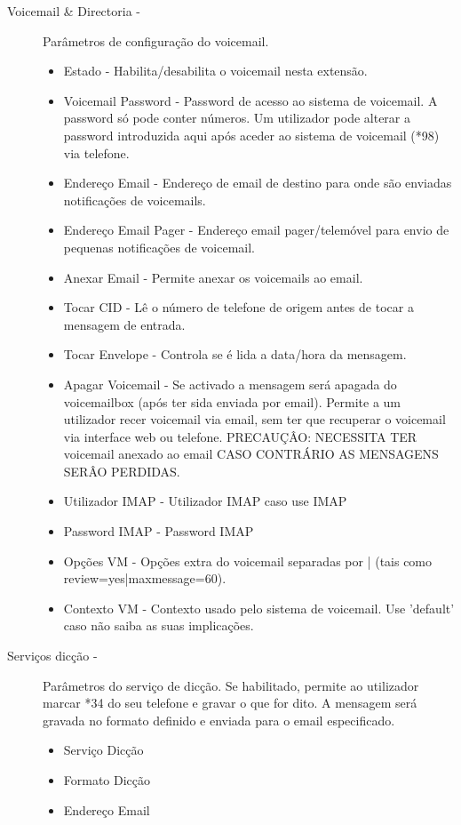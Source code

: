 \begin{description}
\begin{description}
            \item[Voicemail \& Directoria -] Parâmetros de configuração do voicemail.
                \begin{itemize}
                    \item Estado - Habilita/desabilita o voicemail nesta extensão.
                    \item Voicemail Password - Password de acesso ao sistema de voicemail. A password só pode conter números. Um utilizador pode alterar a password introduzida aqui após aceder ao sistema de voicemail (*98) via telefone.
                    \item Endereço Email - Endereço de email de destino para onde são enviadas notificações de voicemails.
                    \item Endereço Email Pager - Endereço email pager/telemóvel para envio de pequenas notificações de voicemail.
                    \item Anexar Email - Permite anexar os voicemails ao email.
                    \item Tocar CID - Lê o número de telefone de origem antes de tocar a mensagem de entrada.
                    \item Tocar Envelope - Controla se é lida a data/hora da mensagem.
                    \item Apagar Voicemail - Se activado a mensagem será apagada do voicemailbox (após ter sida enviada por email). Permite a um utilizador recer voicemail via email, sem ter que recuperar o voicemail via interface web ou telefone.  PRECAUÇÂO: NECESSITA TER voicemail anexado ao email CASO CONTRÁRIO AS MENSAGENS SERÂO PERDIDAS.
                    \item Utilizador IMAP - Utilizador IMAP caso use IMAP
                    \item Password IMAP - Password IMAP
                    \item Opções VM - Opções extra do voicemail separadas por | (tais como review=yes|maxmessage=60).
                    \item Contexto VM - Contexto usado pelo sistema de voicemail. Use 'default' caso não saiba as suas implicações.
                \end{itemize}

            \item[Serviços dicção -] Parâmetros do serviço de dicção. Se habilitado, permite ao utilizador marcar *34 do seu telefone e gravar o que for dito. A mensagem será gravada no formato definido e enviada para o email especificado.
                \begin{itemize}
                    \item Serviço Dicção
                    \item Formato Dicção
                    \item Endereço Email
                \end{itemize}


\end{description}
\end{description}
